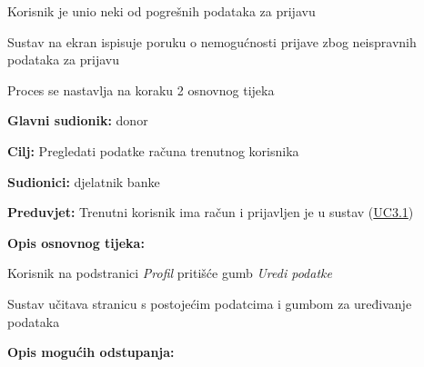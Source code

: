 \begin{packed_item}
\begin{packed_enum}
	                        \item[4.b] Korisnik je unio neki od pogrešnih podataka za prijavu
	                        \item[] \begin{packed_enum}
    	                        \item Sustav na ekran ispisuje poruku o nemogućnosti prijave zbog neispravnih podataka za prijavu
    	                        \item Proces se nastavlja na koraku 2 osnovnog tijeka
					    	\end{packed_enum}
						\end{packed_enum}
						
					\end{packed_item}
					
						
					\noindent {}
					\begin{packed_item}  \label{UC4}
	
						\item \textbf{Glavni sudionik: }donor
						\item  \textbf{Cilj:} Pregledati podatke računa trenutnog korisnika
						\item  \textbf{Sudionici:} djelatnik banke
						\item  \textbf{Preduvjet:} Trenutni korisnik ima račun i prijavljen je u sustav (\hyperref[UC3.1]{UC3.1})
						\item  \textbf{Opis osnovnog tijeka:}
						
						\item[] \begin{packed_enum}
	
	                        \item Korisnik na podstranici \textit{Profil} pritišće gumb \textit{Uredi podatke}
	                        \item Sustav učitava stranicu s postojećim podatcima i gumbom za uređivanje podataka

						\end{packed_enum}
						
						\item  \textbf{Opis mogućih odstupanja:}

						
					\end{packed_item}
					

